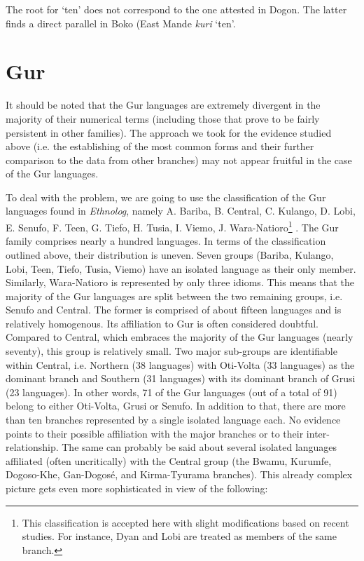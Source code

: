 The root for ‘ten’ does not correspond to the one attested in Dogon. The latter finds a direct parallel in Boko (East Mande \textit{kuri} ‘ten’.

\section{Gur}%

It should be noted that the Gur languages are extremely divergent in the majority of their numerical terms (including those that prove to be fairly persistent in other families). The approach we took for the evidence studied above (i.e. the establishing of the most common forms and their further comparison to the data from other branches) may not appear fruitful in the case of the Gur languages.

To deal with the problem, we are going to use the classification of the Gur languages found in \textit{Ethnolog}, namely A. Bariba, B. Central, C. Kulango, D. Lobi, E. Senufo, F. Teen, G. Tiefo, H. Tusia, I. Viemo, J. Wara-Natioro\footnote{This classification is accepted here with slight modifications based on recent studies. For instance, Dyan and Lobi  are treated as members of the same branch.} . The Gur family comprises nearly a hundred languages. In terms of the classification outlined above, their distribution is uneven. Seven groups (Bariba, Kulango, Lobi, Teen, Tiefo, Tusia, Viemo) have an isolated language as their only member. Similarly, Wara-Natioro is represented by only three idioms. This means that the majority of the Gur languages are split between the two remaining groups, i.e. Senufo and Central. The former is comprised of about fifteen languages and is relatively homogenous. Its affiliation to Gur is often considered doubtful. Compared to Central, which embraces the majority of the Gur languages (nearly seventy), this group is relatively small. Two major sub-groups are identifiable within Central, i.e. Northern (38 languages) with Oti-Volta (33 languages) as the dominant branch and Southern (31 languages) with its dominant branch of Grusi (23 languages). In other words, 71 of the Gur languages (out of a total of 91) belong to either Oti-Volta, Grusi or Senufo. In addition to that, there are more than ten branches represented by a single isolated language each. No evidence points to their possible affiliation with the major branches or to their inter-relationship. The same can probably be said about several isolated languages affiliated (often uncritically) with the Central group (the Bwamu, Kurumfe, Dogoso-Khe, Gan-Dogosé, and Kirma-Tyurama branches). This already complex picture gets even more sophisticated in view of the following: 

